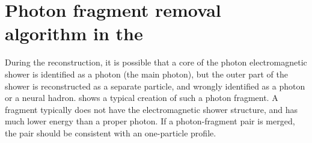 \section{Photon fragment removal algorithm in the \ECAL}
\label{sec:photonFragRemoval}
During the reconstruction, it is possible that a core of the photon electromagnetic shower is identified as a photon (the main photon), but the outer part of the shower is reconstructed as a separate particle, and wrongly identified as a photon or a neural hadron.  shows a typical creation of such a photon fragment. A fragment typically does not have the electromagnetic shower structure, and has much lower energy than a proper photon. If a photon-fragment pair is merged, the pair should be consistent with an one-particle profile.

\begin{figure}[tbph]
\centering


\end{figure}
